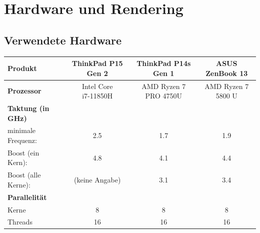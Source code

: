 \section{Hardware und Rendering}
\subsection{Verwendete Hardware}\label{Hardware}
\begin{table}[h]
    \centering
\begin{tabular}{@{}lccc@{}}
    \toprule
    \textbf{Produkt}         & \textbf{ThinkPad P15 Gen 2}                       & \textbf{ThinkPad P14s Gen 1}           & \textbf{ASUS ZenBook 13}            \\
    \midrule
    \textbf{Prozessor}       & \makecell{Intel Core \\ i7-11850H}          & \makecell{AMD Ryzen 7 \\ PRO 4750U}    & \makecell{AMD Ryzen 7 \\ 5800 U}  
    \vspace{2mm} \\ %
    \textbf{Taktung (in GHz)}&                                             &                                        &                                     \\ 
    minimale Frequenz:       & 2.5                                         & 1.7                                    & 1.9                                 \\ 
    Boost (ein Kern):        & 4.8                                         & 4.1                                    & 4.4                                 \\ 
    Boost (alle Kerne):      & (keine Angabe)                              & 3.1                                    & 3.4                       
    \vspace{3mm} \\ %
    \textbf{Parallelität}    &                                             &                                        &                                     \\
    Kerne                    & 8                                           & 8                                      & 8                                   \\
    Threads                  & 16                                          & 16                                     & 16 
    \vspace{3mm} \\ %

\end{tabular}
\end{table}
